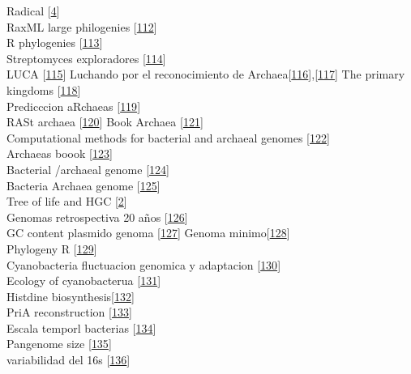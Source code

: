 \documentclass[12pt,twoside]{reedthesis}
\begin{document}
  Radical {[}\protect\hyperlink{ref-narechania_random_2012}{4}{]}\\
  RaxML large philogenies
  {[}\protect\hyperlink{ref-stamatakis_raxml_2014}{112}{]}\\
  R phylogenies
  {[}\protect\hyperlink{ref-phyloseq_powerful_2016}{113}{]}\\
  Streptomyces exploradores
  {[}\protect\hyperlink{ref-zacharia_exploring_2017}{114}{]}\\
  LUCA {[}\protect\hyperlink{ref-woese_universal_1998}{115}{]} Luchando
  por el reconocimiento de
  Archaea{[}\protect\hyperlink{ref-woese_are_1981}{116}{]},{[}\protect\hyperlink{ref-woese_towards_1990}{117}{]}
  The primary kingdoms
  {[}\protect\hyperlink{ref-woese_phylogenetic_1977}{118}{]}\\
  Predicccion aRchaeas
  {[}\protect\hyperlink{ref-woese_there_1994}{119}{]}\\
  RASt archaea {[}\protect\hyperlink{ref-graham_archaeal_2000}{120}{]}
  Book Archaea
  {[}\protect\hyperlink{ref-howland_surprising_2000}{121}{]}\\
  Computational methods for bacterial and archaeal genomes
  {[}\protect\hyperlink{ref-xu_computational_2008}{122}{]}\\
  Archaeas boook {[}\protect\hyperlink{ref-garrett_archaea_2008}{123}{]}\\
  Bacterial /archaeal genome
  {[}\protect\hyperlink{ref-koonin_comparison_1997}{124}{]}\\
  Bacteria Archaea genome
  {[}\protect\hyperlink{ref-koonin_genomics_2008}{125}{]}\\
  Tree of life and HGC
  {[}\protect\hyperlink{ref-koonin_turbulent_2015}{2}{]}\\
  Genomas retrospectiva 20 años
  {[}\protect\hyperlink{ref-land_insights_2015}{126}{]}\\
  GC content plasmido genoma
  {[}\protect\hyperlink{ref-nishida_evolution_2012}{127}{]} Genoma
  minimo{[}\protect\hyperlink{ref-coyle_mysteries_2016}{128}{]}\\
  Phylogeny R {[}\protect\hyperlink{ref-omeara_cran_2016}{129}{]}\\
  Cyanobacteria fluctuacion genomica y adaptacion
  {[}\protect\hyperlink{ref-larsson_genome_2011}{130}{]}\\
  Ecology of cyanobacterua
  {[}\protect\hyperlink{ref-whitton_ecology_2012}{131}{]}\\
  Histdine
  biosynthesis{[}\protect\hyperlink{ref-cohen_biosynthesis_2004}{132}{]}\\
  PriA reconstruction
  {[}\protect\hyperlink{ref-plach_long-term_2016}{133}{]}\\
  Escala temporl bacterias
  {[}\protect\hyperlink{ref-battistuzzi_genomic_2004}{134}{]}\\
  Pangenome size
  {[}\protect\hyperlink{ref-lapierre_estimating_2009}{135}{]}\\
  variabilidad del 16s
  {[}\protect\hyperlink{ref-vetrovsky_variability_2013}{136}{]}
  
\end{document}
